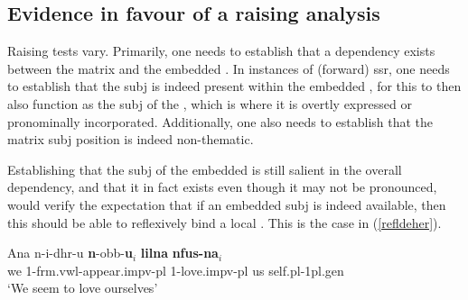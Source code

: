 \documentclass[output=paper]{LSP/langsci}
\begin{document}

\subsection{Evidence in favour of a raising analysis}


Raising tests vary. Primarily, one needs to establish that a dependency exists between the matrix and the embedded . In instances of (forward) {\sc ssr}, one needs to establish that the {\sc subj} is indeed present within the embedded , for this to then also function as the {\sc subj} of the , which is where it is overtly expressed or pronominally incorporated. Additionally, one also needs to establish that the matrix {\sc subj} position is indeed non-thematic.

Establishing that the {\sc subj} of the embedded  is still salient in the overall dependency, and that it in fact exists even though it may not be pronounced, 
would verify the expectation that if an embedded {\sc subj} is indeed available, then this should be able to reflexively bind a local . This is the case in (\ref{refldeher}).

\ea \label{refldeher}
\gll A\textcrh na n-i-dhr-u {\bf{n}}-\textcrh obb-{\bf{u}}$_{i}$ {\bf{lilna}} {\bf{nfus-na}}$_{i}$\\
we 1-{\sc frm.vwl}-appear.{\sc impv-pl} 1-love.{\sc impv-pl} us self.{\sc pl-1pl.gen}\\
\glt `We seem to love ourselves'
\z

\end{document}

